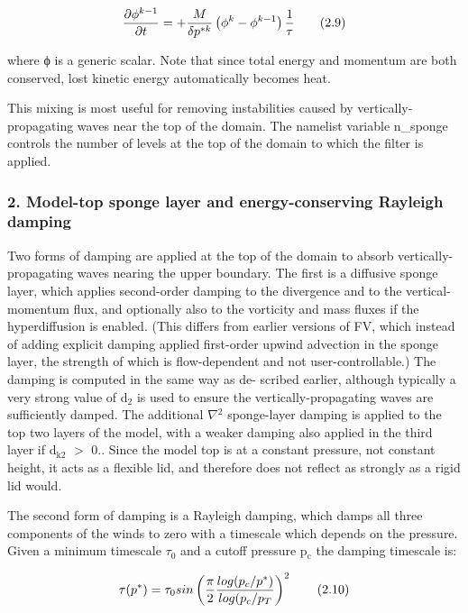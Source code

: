 \[ \frac{\partial \phi^{k-1}}{\partial t} = + \frac{M}{\delta p^{*k} } \left(\phi^k - \phi^{k-1} \right) \frac{1}{\tau} \\ \tag {2.9} \]

where ϕ is a generic scalar. Note that since total energy and momentum are both conserved, lost kinetic energy automatically becomes heat.

This mixing is most useful for removing instabilities caused by vertically-\/ propagating waves near the top of the domain. The namelist variable {\ttfamily n\-\_\-sponge} controls the number of levels at the top of the domain to which the filter is applied.

\subsubsection*{2. Model-\/top sponge layer and energy-\/conserving Rayleigh damping}

Two forms of damping are applied at the top of the domain to absorb vertically-\/ propagating waves nearing the upper boundary. The first is a diffusive sponge layer, which applies second-\/order damping to the divergence and to the vertical-\/momentum flux, and optionally also to the vorticity and mass fluxes if the hyperdiffusion is enabled. (This differs from earlier versions of F\-V, which instead of adding explicit damping applied first-\/order upwind advection in the sponge layer, the strength of which is flow-\/dependent and not user-\/controllable.) The damping is computed in the same way as de-\/ scribed earlier, although typically a very strong value of d$_{\mbox{2}}$  is used to ensure the vertically-\/propagating waves are sufficiently damped. The additional {$\nabla$}$^{\mbox{2}}$  sponge-\/layer damping is applied to the top two layers of the model, with a weaker damping also applied in the third layer if d$_{\mbox{k2}}$  $>$ 0.. Since the model top is at a constant pressure, not constant height, it acts as a flexible lid, and therefore does not reflect as strongly as a rigid lid would.

The second form of damping is a Rayleigh damping, which damps all three components of the winds to zero with a timescale which depends on the pressure. Given a minimum timescale {$\tau$}$_{\mbox{0}}$  and a cutoff pressure p$_{\mbox{c}}$  the damping timescale is\-:

\[ \tau(p^*) = \tau_0 sin \left( \frac{\pi}{2} \frac{log(p_c / p^*)}{log(p_c / p_T} \right)^2 \\ \tag {2.10} \]

